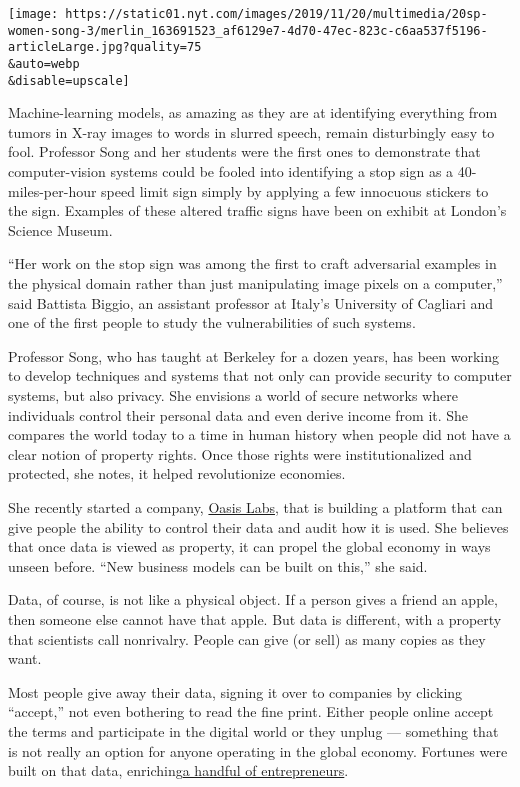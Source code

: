 \texttt{[image: https://static01.nyt.com/images/2019/11/20/multimedia/20sp-women-song-3/merlin\_163691523\_af6129e7-4d70-47ec-823c-c6aa537f5196-articleLarge.jpg?quality=75\\\&auto=webp\\\&disable=upscale]}

Machine-learning models, as amazing as they are at identifying
everything from tumors in X-ray images to words in slurred speech,
remain disturbingly easy to fool. Professor Song and her students were
the first ones to demonstrate that computer-vision systems could be
fooled into identifying a stop sign as a 40-miles-per-hour speed limit
sign simply by applying a few innocuous stickers to the sign. Examples
of these altered traffic signs have been on exhibit at London's Science
Museum.

``Her work on the stop sign was among the first to craft adversarial
examples in the physical domain rather than just manipulating image
pixels on a computer,'' said Battista Biggio, an assistant professor at
Italy's University of Cagliari and one of the first people to study the
vulnerabilities of such systems.

Professor Song, who has taught at Berkeley for a dozen years, has been
working to develop techniques and systems that not only can provide
security to computer systems, but also privacy. She envisions a world of
secure networks where individuals control their personal data and even
derive income from it. She compares the world today to a time in human
history when people did not have a clear notion of property rights. Once
those rights were institutionalized and protected, she notes, it helped
revolutionize economies.

She recently started a company, \href{https://www.oasislabs.com/}{Oasis
Labs}, that is building a platform that can give people the ability to
control their data and audit how it is used. She believes that once data
is viewed as property, it can propel the global economy in ways unseen
before. ``New business models can be built on this,'' she said.

Data, of course, is not like a physical object. If a person gives a
friend an apple, then someone else cannot have that apple. But data is
different, with a property that scientists call nonrivalry. People can
give (or sell) as many copies as they want.

Most people give away their data, signing it over to companies by
clicking ``accept,'' not even bothering to read the fine print. Either
people online accept the terms and participate in the digital world or
they unplug --- something that is not really an option for anyone
operating in the global economy. Fortunes were built on that data,
enriching\href{https://www.entrepreneur.com/article/319952}{a handful of
entrepreneurs}.

